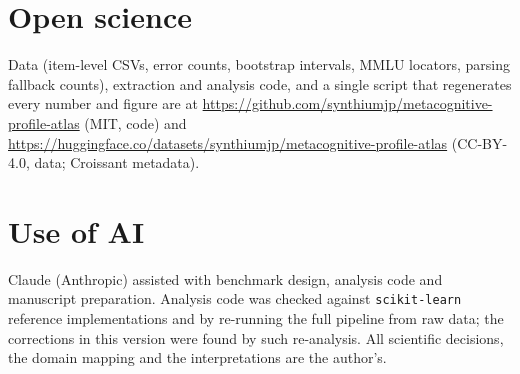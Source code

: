 \section*{Open science}

Data (item-level CSVs, error counts, bootstrap intervals, MMLU locators, parsing fallback counts), extraction and analysis code, and a single script that regenerates every number and figure are at \url{https://github.com/synthiumjp/metacognitive-profile-atlas} (MIT, code) and \url{https://huggingface.co/datasets/synthiumjp/metacognitive-profile-atlas} (CC-BY-4.0, data; Croissant metadata).

\section*{Use of AI}

Claude (Anthropic) assisted with benchmark design, analysis code and manuscript preparation. Analysis code was checked against \texttt{scikit-learn} reference implementations and by re-running the full pipeline from raw data; the corrections in this version were found by such re-analysis. All scientific decisions, the domain mapping and the interpretations are the author's.
